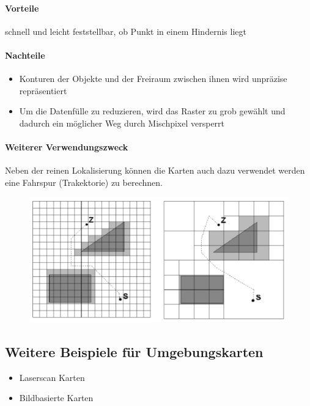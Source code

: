 \paragraph{Vorteile} schnell und leicht feststellbar, ob Punkt in einem Hindernis liegt
\paragraph{Nachteile} 
\begin{itemize}
	\item Konturen der Objekte und der Freiraum zwischen ihnen wird unpräzise repräsentiert
	\item Um die Datenfülle zu reduzieren, wird das Raster zu grob gewählt und dadurch ein möglicher Weg durch Mischpixel versperrt
\end{itemize}
\paragraph{Weiterer Verwendungszweck}
Neben der reinen Lokalisierung können die Karten auch dazu verwendet werden eine Fahrspur (Trakektorie) zu berechnen.
\begin{figure}[H]
	\begin{center}
		\includegraphics[scale=0.5]{Resources/PNG/Trajektorie}
		\caption{}
		\label{fig:PNG/Trajektorie}
	\end{center}
\end{figure}
\subsection{Weitere Beispiele für Umgebungskarten}
\begin{itemize}
	\item Laserscan Karten
	\item Bildbasierte Karten
\end{itemize}
